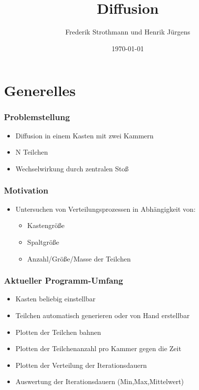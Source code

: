 \documentclass{beamer}
\title{Diffusion}
\author{Frederik Strothmann und Henrik Jürgens}
\date{\today}
\begin{document}
\maketitle
\frame{\tableofcontents[currentsection]}
 


\section{Generelles}

\begin{frame} %
  \frametitle{Problemstellung} %
 \begin{itemize}
 		\item Diffusion in einem Kasten mit zwei Kammern
        \item N Teilchen
        \item Wechselwirkung durch zentralen Stoß
\end{itemize}
\end{frame}

\begin{frame} %
  \frametitle{Motivation} %
 \begin{itemize}
 		\item Untersuchen von Verteilungsprozessen in Abhängigkeit von:
 		\begin{itemize}
 			\item Kastengröße
 			\item Spaltgröße
 			\item Anzahl/Größe/Masse der Teilchen
 		\end{itemize}
\end{itemize}
\end{frame}


\begin{frame} %
  \frametitle{Aktueller Programm-Umfang} %
 \begin{itemize}
 		\item Kasten beliebig einstellbar
 		\item Teilchen automatisch generieren oder von Hand erstellbar
 		\item Plotten der Teilchen bahnen
 		\item Plotten der Teilchenanzahl pro Kammer gegen die Zeit
 		\item Plotten der Verteilung der Iterationsdauern
 		\item Auswertung der Iterationsdauern (Min,Max,Mittelwert)
\end{itemize}
\end{frame}
\end{document}
